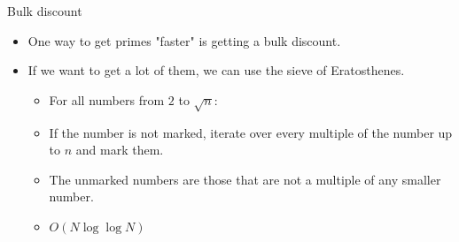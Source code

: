 \documentclass{beamer}
\begin{document}
\begin{frame}{Bulk discount}
  \begin{itemize}
    \item One way to get primes "faster" is getting a bulk discount. 
    \item If we want to get a lot of them, we can use the sieve of Eratosthenes.
      \begin{itemize}
        \item For all numbers from $2$ to $\sqrt{n}$:
        \item If the number is not marked, iterate over every multiple of the
          number up to $n$ and mark them.
        \item The unmarked numbers are those that are not a multiple of any
          smaller number.
        \item $O(N\log \log N)$
      \end{itemize}
  \end{itemize}
\end{frame}
\end{document}
